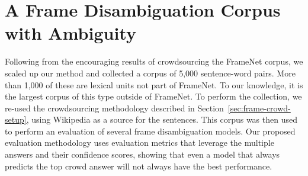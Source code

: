 \section{A Frame Disambiguation Corpus with Ambiguity}

Following from the encouraging results of crowdsourcing the FrameNet corpus, we scaled up our method and collected a corpus of 5,000 sentence-word pairs. More than 1,000 of these are lexical units not part of FrameNet. To our knowledge, it is the largest corpus of this type outside of FrameNet. To perform the collection, we re-used the crowdsourcing methodology described in Section~\ref{sec:frame-crowd-setup}, using Wikipedia as a source for the sentences. This corpus was then used to perform an evaluation of several frame disambiguation models. Our proposed evaluation methodology uses evaluation metrics that leverage the multiple answers and their confidence scores, showing that even a model that always predicts the top crowd answer will not always have the best performance.


